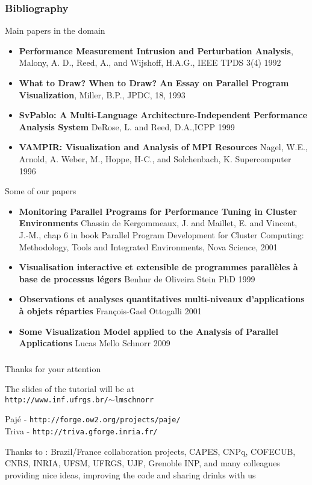 \begin{frame}
\frametitle{Bibliography}
\tiny{
\begin{block}{Main papers in the domain}
\begin{itemize}
\item \textbf{{P}erformance {M}easurement {I}ntrusion and {P}erturbation {A}nalysis},
Malony, A. D., Reed, A., and Wijshoff, H.A.G., IEEE TPDS 3(4) 1992\\
\item \textbf{What to Draw? When to Draw? An Essay on Parallel Program Visualization},
Miller, B.P., JPDC, 18, 1993\\
\item \textbf{SvPablo: A Multi-Language Architecture-Independent Performance Analysis System}
DeRose, L. and Reed, D.A.,ICPP 1999\\
\item \textbf{{VAMPIR}: Visualization and Analysis of {MPI} Resources} Nagel, W.E., Arnold, A. Weber, M., Hoppe, H-C.,  and Solchenbach, K. 
Supercomputer 1996
\end{itemize}
\end{block}
\begin{block}{Some of our papers}
\begin{itemize}
\item \textbf{Monitoring Parallel Programs for Performance Tuning in Cluster Environments} Chassin de Kergommeaux, J. and Maillet, E. and Vincent, J.-M.,
chap 6 in book Parallel Program Development for Cluster Computing:
Methodology, Tools and Integrated Environments, Nova Science, 2001
\item \textbf{Visualisation interactive et extensible de programmes parall\`eles à base de processus légers} Benhur de Oliveira Stein PhD 1999
\item \textbf{Observations et analyses quantitatives multi-niveaux d’applications \`a objets r\'eparties} François-Gael Ottogalli 2001
\item \textbf{Some Visualization Model applied to the Analysis of Parallel Applications} Lucas Mello Schnorr 2009
\end{itemize}
\end{block}
}
\end{frame}
\begin{frame}
\frametitle{}
Thanks for your attention


The slides of the tutorial will be at\\
 \texttt{http://www.inf.ufrgs.br/$\sim$lmschnorr}

\vfill

Paj\'e - \texttt{http://forge.ow2.org/projects/paje/} \\
Triva - \texttt{http://triva.gforge.inria.fr/}

\vfill

Thanks to : Brazil/France collaboration projects, CAPES, CNPq, COFECUB, CNRS, INRIA, UFSM, UFRGS, UJF, Grenoble INP,  and many colleagues providing nice ideas, improving the code and sharing drinks with us
\end{frame}

